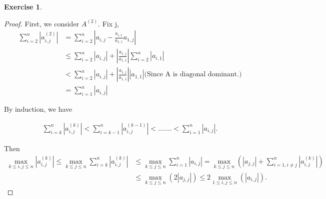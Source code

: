 \documentclass[11pt,a4paper]{article}
\renewcommand{\(}{\left(}
\renewcommand{\)}{\right)}
\newtheorem{exercise}{Exercise}
\begin{document}
  \begin{exercise}
  \end{exercise}  
  \begin{proof}
  	First, we consider $A^{(2)}.$ Fix j,
  	\begin{align*}  	
  	\sum_{i=2}^{n}\left\vert a_{i,j}^{(2)}\right\vert &=\sum_{i=2}^{n}\left\vert
  	a_{i,j}-\frac{a_{i,1}}{a_{1,1}}a_{1,j}\right\vert \\  	
  	&\leq\sum_{i=2}^{n}\left\vert a_{i,j}\right\vert
  	+\left\vert \frac{a_{1,j}}{a_{1,1}}\right\vert \sum_{i=2}^{n}\left\vert
  	a_{i,1}\right\vert \\  	
  	&<\sum_{i=2}^{n}\left\vert a_{i,j}\right\vert
  	+\left\vert \frac{a_{1,j}}{a_{1,1}}\right\vert \left\vert a_{1,1}\right\vert
  	\text{(Since A is diagonal dominant.)}\\  	
  	&=\sum_{i=1}^{n}\left\vert a_{i,j}\right\vert   	
  	\end{align*}
  	
  	By induction, we have
  	
  	\begin{align*} 
  	\sum_{i=k}^{n}\left\vert a_{i,j}^{(k)}\right\vert <\sum_{i=k-1}^{n}\left\vert
  	a_{i,j}^{(k-1)}\right\vert <.......<\sum_{i=1}^{n}\left\vert a_{i,j}%
  	\right\vert .
  	\end{align*}
  	
  	Then 
  	\begin{align*} 
  	\underset{k\leq i,j\leq n}{\max}\left\vert a_{i,j}^{(k)}\right\vert
  	\leq\underset{k\leq j\leq n}{\max}\sum_{i=k}^{n}\left\vert a_{i,j}%
  	^{(k)}\right\vert
  	&\leq\underset{k\leq j\leq n}{\max}\sum_{i=1}^{n}\left\vert
  	a_{i,j}\right\vert =\underset{k\leq j\leq n}{\max}(\left\vert a_{j,j}%
  	\right\vert +\sum_{i=1,i\neq j}^{n}\left\vert a_{i,j}^{(k)}\right\vert
  	)\\
  	&\leq\underset{k\leq j\leq n}{\max}(2\left\vert a_{j,j}\right\vert
  	)\leq2\underset{1\leq i,j\leq n}{\max}(\left\vert a_{i,j}\right\vert ).
  	\end{align*}
  	
  \end{proof} 
\end{document}
